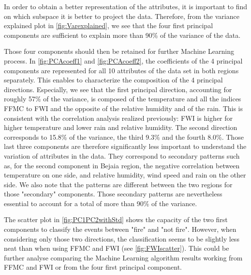 \documentclass[10pt]{article}
\numberwithin{equation}{section}
\numberwithin{figure}{section}
\numberwithin{table}{section}
\begin{document}
In order to obtain a better representation of the attributes, it is important to find on which subspace it is better to project the data. Therefore, from the variance explained plot in \autoref{fig:Varexplained}, we see that the four first principal components are sufficient to explain more than 90\% of the variance of the data. 

Those four components should then be retained for further Machine Learning process. In \autoref{fig:PCAcoeff1} and \autoref{fig:PCAcoeff2}, the coefficients of the 4 principal components are represented for all 10 attributes of the data set in both regions separately. This enables to characterize the composition of the 4 principal directions. Especially, we see that the first principal direction, accounting for roughly 57\% of the variance, is composed of the temperature and all the indices FFMC to FWI and the opposite of the relative humidity and of the rain. This is consistent with the correlation analysis realized previously: FWI is higher for higher temperature and lower rain and relative humidity. The second direction corresponds to 15.8\% of the variance, the third 9.3\% and the fourth 8.0\%. Those last three components are therefore significantly less important to understand the variation of attributes in the data. They correspond to secondary patterns such as, for the second component in Bejaia region, the negative correlation between temperature on one side, and relative humidity, wind speed and rain on the other side. We also note that the patterns are different between the two regions for those "secondary" components. Those secondary patterns are nevertheless essential to account for a total of more than 90\% of the variance.

The scatter plot in \autoref{fig:PC1PC2withStd} shows the capacity of the two first components to classify the events between "fire" and "not fire". However, when considering only those two directions, the classification seems to be slightly less neat than when using FFMC and FWI (see \autoref{fig:FWIscatter}). This could be further analyse comparing the Machine Learning algorithm results working from FFMC and FWI or from the four first principal component.
\end{document}
